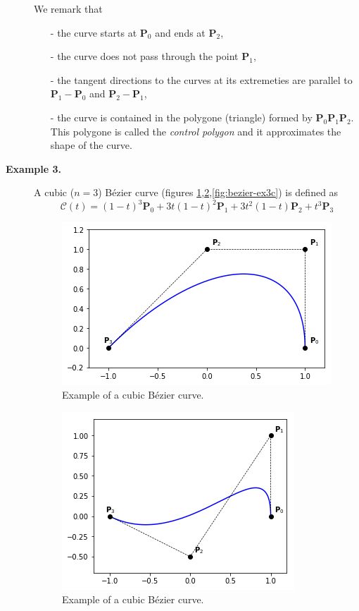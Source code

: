 \begin{description}
  We remark that
  \begin{itemize}
    \item[-] the curve starts at $\mathbf{P}_{0}$ and  ends at $\mathbf{P}_{2}$,
    \item[-] the curve does not pass through the point $\mathbf{P}_{1}$,
    \item[-] the tangent directions to the curves at its extremeties are parallel to $\mathbf{P}_{1} - \mathbf{P}_{0}$ and $\mathbf{P}_{2} - \mathbf{P}_{1}$,
    \item[-] the curve is contained in the polygone (triangle) formed by $\mathbf{P}_{0}\mathbf{P}_{1}\mathbf{P}_{2}$. This polygone is called the \textit{control polygon} and it approximates the shape of the curve.
  \end{itemize}

  \item[\textbf{Example 3.}] A cubic ($n=3$) B\'ezier curve (figures \ref{fig:bezier-ex3a},\ref{fig:bezier-ex3b},\ref{fig:bezier-ex3c}) is defined as 
    $$\mathcal{C}(t) = (1-t)^3 \mathbf{P}_0  + 3t(1-t)^2 \mathbf{P}_1 + 3t^2(1-t) \mathbf{P}_2 + t^3 \mathbf{P}_3$$  

  \begin{figure}
  \centering
  \includegraphics[width=.6\textwidth]{figures/cad/bezier/ex3a}
  \caption{Example of a cubic B\'ezier curve.}
  \label{fig:bezier-ex3a}
  \end{figure}

  \begin{figure}
  \centering
  \includegraphics[width=.6\textwidth]{figures/cad/bezier/ex3b}
  \caption{Example of a cubic B\'ezier curve.}
  \label{fig:bezier-ex3b}
  \end{figure}


\end{description}
